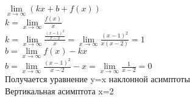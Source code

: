 \documentclass[a4paper]{article}
\begin{document}
        $\lim\limits_{x \to \infty} (kx+b+f(x))$\\
        $k=\lim\limits_{x \to \infty} \frac{f(x)}{x}$\\
        $k=\lim\limits_{x \to \infty} \frac{\frac{(x-1)^{2}}{x-2}}{x}
        =\lim\limits_{x \to \infty} \frac{(x-1)^{2}}{x(x-2)}=1$\\
        $b=\lim\limits_{x \to \infty} f(x)-kx$\\
        $b=\lim\limits_{x \to \infty} \frac{(x-1)^{2}}{x-2}-x
        =\lim\limits_{x \to \infty} \frac{1}{x-2}=0$\\
        Получается уравнение y=x наклонной асимптоты\\
        Вертикальная асимптота x=2\\
\end{document}
